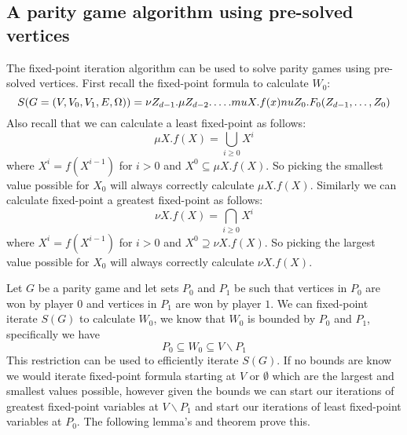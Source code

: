 \subsection{A parity game algorithm using pre-solved vertices}
The fixed-point iteration algorithm can be used to solve parity games using pre-solved vertices. First recall the fixed-point formula to calculate $W_0$:
\[ S(G = (V,V_0,V_1,E,\Omega)) = \nu Z_{d-1}. \mu Z_{d-2}. \dots . \\mu X.f(x)nu Z_0. F_0(Z_{d-1},\dots,Z_0) \]
Also recall that we can calculate a least fixed-point as follows:
\[ \mu X.f(X) = \bigcup_{i \geq 0} X^i \]
where $X^i = f(X^{i-1})$ for $i > 0$ and $X^0 \subseteq \mu X.f(X)$. So picking the smallest value possible for $X_0$ will always correctly calculate $\mu X. f(X)$.
Similarly we can calculate fixed-point a greatest fixed-point as follows:
\[ \nu X.f(X) = \bigcap_{i \geq 0} X^i \]
where $X^i = f(X^{i-1})$ for $i > 0$ and $X^0 \supseteq \nu X.f(X)$. So picking the largest value possible for $X_0$ will always correctly calculate $\nu X. f(X)$.

Let $G$ be a parity game and let sets $P_0$ and $P_1$ be such that vertices in $P_0$ are won by player $0$ and vertices in $P_1$ are won by player $1$. We can fixed-point iterate $S(G)$ to calculate $W_0$, we know that $W_0$ is bounded by $P_0$ and $P_1$, specifically we have
\[ P_0 \subseteq W_0 \subseteq V\backslash P_1\]
This restriction can be used to efficiently iterate $S(G)$. If no bounds are know we would iterate fixed-point formula starting at $V$ or $\emptyset$ which are the largest and smallest values possible, however given the bounds we can start our iterations of greatest fixed-point variables at $V\backslash P_1$ and start our iterations of least fixed-point variables at $P_0$. The following lemma's and theorem prove this.

